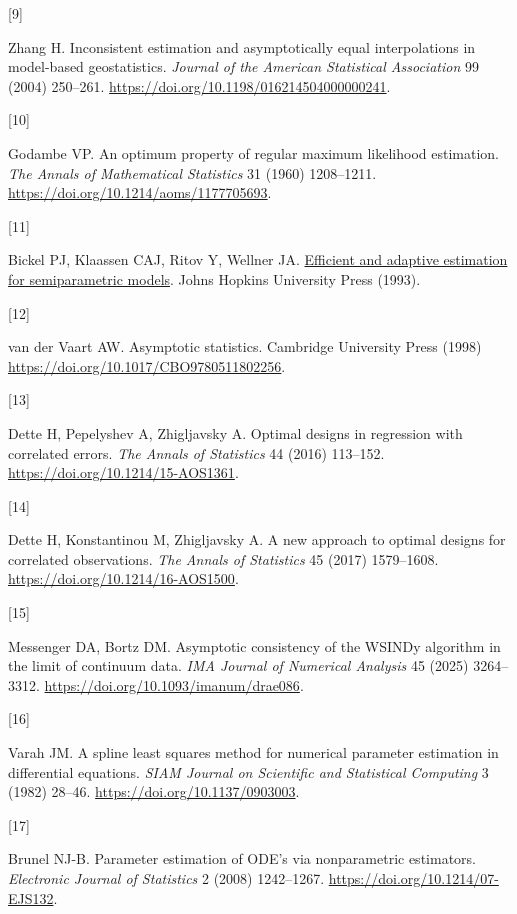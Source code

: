\documentclass[
  american,
  11pt,
]{article}
\newlength{\cslhangindent}
\newlength{\csllabelwidth}
\newenvironment{CSLReferences}[2] %
 {\begin{list}{}{%
  \setlength{\itemindent}{0pt}
  \setlength{\leftmargin}{0pt}
  \setlength{\parsep}{0pt}
  \ifodd #1
   \setlength{\leftmargin}{\cslhangindent}
   \setlength{\itemindent}{-1\cslhangindent}
  \fi
  \setlength{\itemsep}{#2\baselineskip}}}
 {\end{list}}
\newcommand{\CSLLeftMargin}[1]{\parbox[t]{\csllabelwidth}{\strut#1\strut}}
\newcommand{\CSLRightInline}[1]{\parbox[t]{\linewidth - \csllabelwidth}{\strut#1\strut}}
\begin{document}
\begin{CSLReferences}{0}{0}
\CSLLeftMargin{{[}9{]} }%
\CSLRightInline{Zhang H. Inconsistent estimation and asymptotically
equal interpolations in model-based geostatistics. \emph{Journal of the
American Statistical Association} 99 (2004) 250--261.
\url{https://doi.org/10.1198/016214504000000241}.}

\CSLLeftMargin{{[}10{]} }%
\CSLRightInline{Godambe VP. An optimum property of regular maximum
likelihood estimation. \emph{The Annals of Mathematical Statistics} 31
(1960) 1208--1211. \url{https://doi.org/10.1214/aoms/1177705693}.}

\CSLLeftMargin{{[}11{]} }%
\CSLRightInline{Bickel PJ, Klaassen CAJ, Ritov Y, Wellner JA.
\href{https://faculty.washington.edu/jonw/RESEARCH/BOOKS/book3.html}{Efficient
and adaptive estimation for semiparametric models}. Johns Hopkins
University Press (1993).}

\CSLLeftMargin{{[}12{]} }%
\CSLRightInline{{van der Vaart AW}. Asymptotic statistics. Cambridge
University Press (1998) \url{https://doi.org/10.1017/CBO9780511802256}.}

\CSLLeftMargin{{[}13{]} }%
\CSLRightInline{Dette H, Pepelyshev A, Zhigljavsky A. Optimal designs in
regression with correlated errors. \emph{The Annals of Statistics} 44
(2016) 113--152. \url{https://doi.org/10.1214/15-AOS1361}.}

\CSLLeftMargin{{[}14{]} }%
\CSLRightInline{Dette H, Konstantinou M, Zhigljavsky A. A new approach
to optimal designs for correlated observations. \emph{The Annals of
Statistics} 45 (2017) 1579--1608.
\url{https://doi.org/10.1214/16-AOS1500}.}

\CSLLeftMargin{{[}15{]} }%
\CSLRightInline{Messenger DA, Bortz DM. Asymptotic consistency of the
{WSINDy} algorithm in the limit of continuum data. \emph{IMA Journal of
Numerical Analysis} 45 (2025) 3264--3312.
\url{https://doi.org/10.1093/imanum/drae086}.}

\CSLLeftMargin{{[}16{]} }%
\CSLRightInline{Varah JM. A spline least squares method for numerical
parameter estimation in differential equations. \emph{SIAM Journal on
Scientific and Statistical Computing} 3 (1982) 28--46.
\url{https://doi.org/10.1137/0903003}.}

\CSLLeftMargin{{[}17{]} }%
\CSLRightInline{Brunel NJ-B. Parameter estimation of {ODE}'s via
nonparametric estimators. \emph{Electronic Journal of Statistics} 2
(2008) 1242--1267. \url{https://doi.org/10.1214/07-EJS132}.}


\end{CSLReferences}
\end{document}

